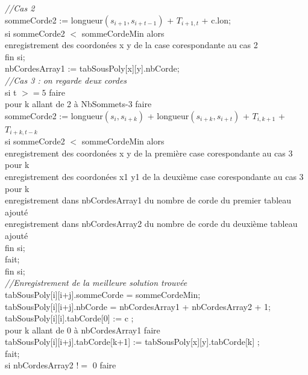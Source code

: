 \documentclass[a4paper,10pt]{article}
\begin{document}
\begin{tabbing}
	\> \> \textit{//Cas 2} \\
	\> \> sommeCorde2 := longueur$(s_{i+1}, s_{i+t-1})$ + $T_{i+1,t}$ + c.lon; \\
	\> \> si sommeCorde2 $<$ sommeCordeMin alors \\
	  \> \> \> enregistrement des coordonées x y de la case corespondante au cas 2 \\
	\> \> fin si; \\
	\> \> nbCordesArray1 := tabSousPoly[x][y].nbCorde; \\
	\> \> \textit{//Cas 3 : on regarde deux cordes} \\
	\> \> si t $>= 5$ faire \\
	  \> \> \> pour k allant de 2 à NbSommets-3 faire \\
	    \> \> \> \> sommeCorde2 := longueur$(s_i, s_{i+k})$ + longueur$(s_{i+k}, s_{i+t})$ + $T_{i,k+1}$ + $T_{i+k,t-k}$ \\
	    \> \> \> \> si sommeCorde2 $<$ sommeCordeMin alors \\
	      \> \> \> \> \>  enregistrement des coordonées x y de la première case corespondante au cas 3 pour k \\
	      \> \> \> \> \>  enregistrement des coordonées x1 y1 de la deuxième case corespondante au cas 3 pour k \\
	      \> \> \> \> \> enregistrement dans nbCordesArray1 du nombre de corde du premier tableau ajouté \\
	      \> \> \> \> \> enregistrement dans nbCordesArray2 du nombre de corde du deuxième tableau ajouté \\	      
	    \> \> \> \> fin si; \\
	  \> \> \> fait; \\
	\> \> fin si; \\
	\> \> \textit{//Enregistrement de la meilleure solution trouvée }\\
	\> \> tabSousPoly[i][i+j].sommeCorde = sommeCordeMin; \\
	\> \> tabSousPoly[i][i+j].nbCorde = nbCordesArray1 + nbCordesArray2 + 1; \\
	\> \> tabSousPoly[i][i].tabCorde[0] := c ; \\
	\> \> pour k allant de 0 à nbCordesArray1 faire \\
	  \> \> \> tabSousPoly[i][i+j].tabCorde[k+1] := tabSousPoly[x][y].tabCorde[k] ; \\
	\> \> fait; \\
	\> \> si nbCordesArray2 $!=$ 0 faire \\

\end{tabbing}
\end{document}
